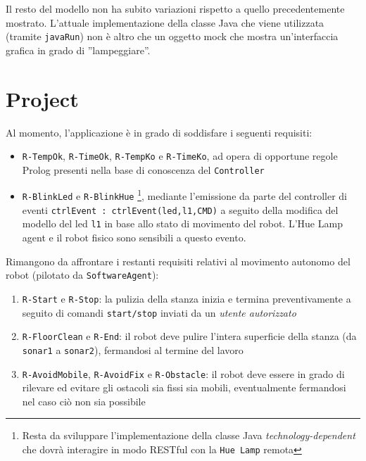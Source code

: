 \documentclass{../llncs}
\newcommand{\codescript}[1]{{\mbox{\small{\texttt{#1}}}}\xspace}
\newcommand{\code}[1]{{\color{blue}\small{\texttt{#1}}}}
\newcommand{\labelsec}[1]{\label{sec:#1}}
\begin{document}


Il resto del modello non ha subito variazioni rispetto a quello precedentemente mostrato. L'attuale implementazione della classe Java che viene utilizzata (tramite \codescript{javaRun}) non è altro che un oggetto mock che mostra un'interfaccia grafica in grado di ''lampeggiare''.

\section{Project}
\labelsec{Project}
Al momento, l'applicazione è in grado di soddisfare i seguenti requisiti:
\begin{itemize}
\item \code{R-TempOk}, \code{R-TimeOk}, \code{R-TempKo} e \code{R-TimeKo}, ad opera di opportune regole Prolog presenti nella base di conoscenza del \texttt{Controller}
\item \code{R-BlinkLed} e \code{R-BlinkHue}
\footnote{Resta da sviluppare l'implementazione della classe Java \emph{technology-dependent} che dovrà interagire in modo RESTful con la \texttt{Hue Lamp} remota}, mediante l'emissione da parte del controller di eventi \codescript{ctrlEvent : ctrlEvent(led,l1,CMD)} a seguito della modifica del modello del led \codescript{l1} in base allo stato di movimento del robot. L'Hue Lamp agent e il robot fisico sono sensibili a questo evento.
\end{itemize}

Rimangono da affrontare i restanti requisiti relativi al movimento autonomo del robot (pilotato da \texttt{SoftwareAgent}):
\begin{enumerate}
\item \code{R-Start} e \code{R-Stop}: la pulizia della stanza inizia e termina preventivamente a seguito di comandi \texttt{start/stop} inviati da un \emph{utente autorizzato}
\item \code{R-FloorClean} e \code{R-End}: il robot deve pulire l'intera superficie della stanza (da \code{sonar1} a \code{sonar2}), fermandosi al termine del lavoro
\item \code{R-AvoidMobile}, \code{R-AvoidFix} e \code{R-Obstacle}: il robot deve essere in grado di rilevare ed evitare gli ostacoli sia fissi sia mobili, eventualmente fermandosi nel caso ciò non sia possibile
\end{enumerate}
\end{document}
